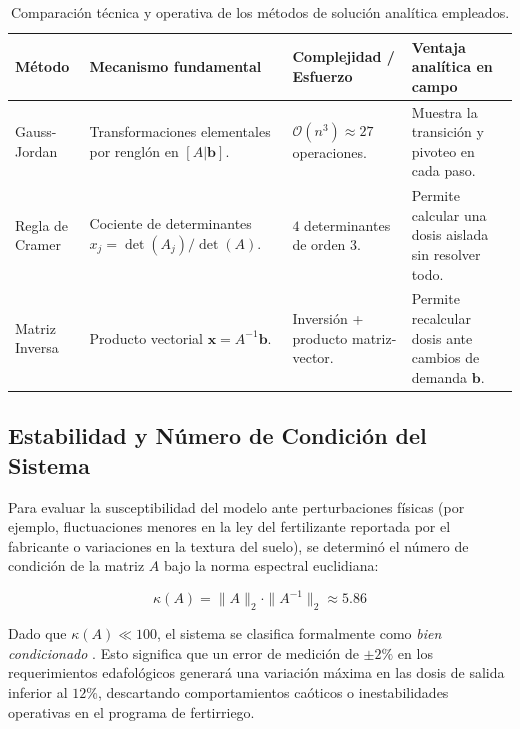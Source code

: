 \begin{table}[H]
\centering
\caption{Comparación técnica y operativa de los métodos de solución analítica empleados.}\label{tab:comparacion_metodos}
\begin{AulatexTable}[\linewidth]
\small
\begin{tabularx}{\linewidth}{@{}>{\bfseries\raggedright\arraybackslash}p{2.3cm} >{\raggedright\arraybackslash}X >{\raggedright\arraybackslash}p{2.8cm} >{\raggedright\arraybackslash}X@{}}
\toprule
\textbf{Método} & \textbf{Mecanismo fundamental} & \textbf{Complejidad / Esfuerzo} & \textbf{Ventaja analítica en campo} \\
\midrule
Gauss-Jordan & Transformaciones elementales por renglón en $[A|\mathbf{b}]$. & $\mathcal{O}(n^3) \approx 27$ operaciones. & Muestra la transición y pivoteo en cada paso. \\
\addlinespace
Regla de Cramer & Cociente de determinantes $x_j = \det(A_j)/\det(A)$. & $4$ determinantes de orden 3. & Permite calcular una dosis aislada sin resolver todo. \\
\addlinespace
Matriz Inversa & Producto vectorial $\mathbf{x} = A^{-1}\mathbf{b}$. & Inversión + producto matriz-vector. & Permite recalcular dosis ante cambios de demanda $\mathbf{b}$. \\
\bottomrule
\end{tabularx}
\end{AulatexTable}
\end{table}
\FloatBarrier

\subsection{Estabilidad y Número de Condición del Sistema}

Para evaluar la susceptibilidad del modelo ante perturbaciones físicas (por ejemplo, fluctuaciones menores en la ley del fertilizante reportada por el fabricante o variaciones en la textura del suelo), se determinó el número de condición de la matriz $A$ bajo la norma espectral euclidiana:

\begin{equation}
\kappa(A) = \|A\|_2 \cdot \|A^{-1}\|_2 \approx 5.86
\end{equation}

Dado que $\kappa(A) \ll 100$, el sistema se clasifica formalmente como \textit{bien condicionado} \parencite{strang2016, lay2016}. Esto significa que un error de medición de $\pm 2\%$ en los requerimientos edafológicos generará una variación máxima en las dosis de salida inferior al $12\%$, descartando comportamientos caóticos o inestabilidades operativas en el programa de fertirriego.

